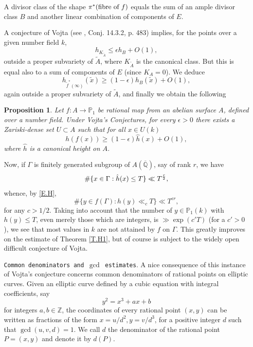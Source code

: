 \documentclass[leqno,12pt]{article} %
\def\Z{{{\mathbb Z}}}
\def\Q{{{\mathbb Q}}}
\def\P{{{\mathbb P}}}
\theoremstyle{plain} %
\newtheorem{proposition}[theorem]{\indent\sc Proposition}
\theoremstyle{definition} %
\begin{document}
A  divisor  class of the shape $\pi^*(\hbox{fibre of $f$}) $ equals the sum of an ample divisor class $B$ and another linear combination of components of $E$. 

A conjecture of Vojta (see \cite{BG}, Conj. 14.3.2, p. 483)  implies, for the points over a given number field $k$, 
\begin{equation*}
h_{K_{\tilde A}}\le \epsilon h_B+O(1),
\end{equation*}
outside a proper subvariety of $\tilde A$, where $K_{\tilde A}$ is the canonical class. But this is equal also to a sum of components of $E$ (since $K_A=0$).  We deduce
\begin{equation*}
 h_{{\tilde f}^*(\infty)}(\tilde x)\ge (1-\epsilon)h_B(\tilde x)+O(1),
\end{equation*}
again outside a proper subvariety of $\tilde A$, and finally we obtain the following

\begin{proposition} Let   $f:A\to \P_1$ be rational map from an abelian surface $A$, defined over a number field. Under Vojta's Conjectures, for every $\epsilon>0$ there exists a Zariski-dense set $U\subset A$ such that for all $x\in U(k)$  
\begin{equation}\label{E.H} 
 h(f(x))\ge (1-\epsilon)\hat h(x)+O(1),
\end{equation}
where $\hat h$ is a canonical height on $A$. 
\end{proposition}
\smallskip

Now, if $\Gamma$ is finitely generated subgroup of $A(\overline\Q)$, say of rank $r$, we have
\begin{equation*}
\#\{x\in \Gamma: \hat h(x)\le T\}\ll T^{r\over 2},
\end{equation*}
whence, by \eqref{E.H}, 
\begin{equation*}
\#\{y\in  f(\Gamma): h(y)\ll_c T\}\ll T^{cr},
\end{equation*}
for any $c>1/2$.  Taking into account that the number of $y\in\P_1(k)$ with $h(y)\le T$, even merely those which are integers, is $\gg  \exp(c' T)$ (for a $c'>0$), we see that most values in $k$ are not attained by $f$ on $\Gamma$.  This greatly improves on the estimate of Theorem \ref{T.H1}, but of course is subject to the widely open difficult conjecture of Vojta.

\medskip
{\tt Common denominators and $\gcd$ estimates}. A nice consequence of this instance of Vojta's conjecture concerns common denominators of rational points on elliptic curves.
Given an elliptic curve defined by a cubic equation with integral coefficients, say
$$
y^2 = x^3 +ax+b
$$
for integers $a,b\in\Z$, the coordinates of  every rational point $(x,y)$ can be written as fractions of the form $x=u/d^2, y=v/d^3$, for a  positive integer $d$ such that $\gcd(u,v,d)=1$. We call $d$ the denominator of the rational point $P=(x,y)$ and denote it by $d(P)$.
\end{document}
